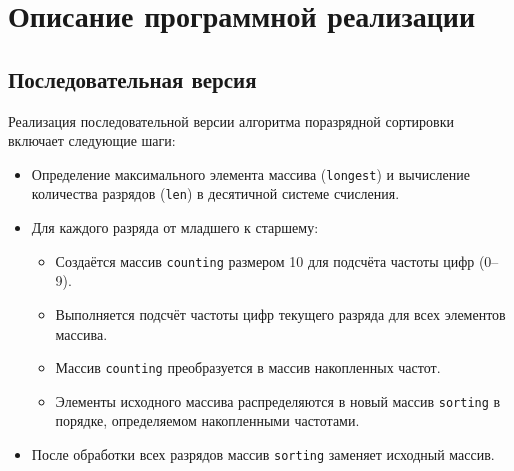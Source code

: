 \documentclass[a4paper,12pt]{article}
\begin{document}
\section{Описание программной реализации}
\subsection{Последовательная версия}
\sloppy
Реализация последовательной версии алгоритма поразрядной сортировки включает следующие шаги:
\begin{itemize}
    \item Определение максимального элемента массива (\texttt{longest}) и вычисление количества разрядов (\texttt{len}) в десятичной системе счисления.
    \item Для каждого разряда от младшего к старшему:
        \begin{itemize}
            \item Создаётся массив \texttt{counting} размером 10 для подсчёта частоты цифр (0–9).
            \item Выполняется подсчёт частоты цифр текущего разряда для всех элементов массива.
            \item Массив \texttt{counting} преобразуется в массив накопленных частот.
            \item Элементы исходного массива распределяются в новый массив \texttt{sorting} в порядке, определяемом накопленными частотами.
        \end{itemize}
    \item После обработки всех разрядов массив \texttt{sorting} заменяет исходный массив.
\end{itemize}
\fussy
\end{document}
